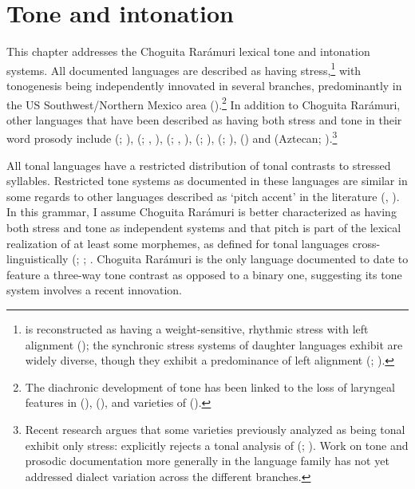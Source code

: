\chapter{Tone and intonation}
\label{chap: tone and intonation}

This chapter addresses the Choguita Rarámuri lexical tone and intonation systems. All documented  languages are described as having stress,\footnote{ is reconstructed as having a weight-sensitive, rhythmic stress with left alignment (\citealt{munro1977towards}); the synchronic stress systems of daughter languages exhibit are widely diverse, though they exhibit a predominance of left alignment (\citealt{caballero2011behind}; ).} with tonogenesis being independently innovated in several branches, predominantly in the US Southwest/Northern Mexico area (\citealt{caballero2020oxford}).\footnote{The diachronic development of tone has been linked to the loss of laryngeal features in  (\citealt{manaster1986genesis}),  (\citealt{shaul2000comparative}), and varieties of  (\citealt{guion2010word}).} In addition to Choguita Rarámuri, other  languages that have been described as having both stress and tone in their word prosody include  (; \citealt{demers1999prominence}),  (; \citealt{hagberg1989floating}, \citealt{hagberg1993autosegmental}),  (; \citealt{bascom1959tonomechanics}, \citealt{woo1970tone}),  (; \citealt{McMahon-1967}),  (; \citealt{grimes1959huichol}),  (\citealt{manaster1986genesis}) and  (Aztecan; \citealt{guion2010word}).\footnote{Recent research argues that some varieties previously analyzed as being tonal exhibit only stress: \citet{reyes2014fonologia} explicitly rejects a tonal analysis of  (; ). Work on tone and prosodic documentation more generally in the language family has not yet addressed dialect variation across the different branches.}

All tonal  languages have a restricted distribution of tonal contrasts to stressed syllables. Restricted tone systems as documented in these languages are similar in some regards to other languages described as `pitch accent' in the literature (\citealt{hyman2006word}, \citealt{van2011pitch}). In this grammar, I assume Choguita Rarámuri is better characterized as having both stress and tone as independent systems and that pitch is part of the lexical realization of at least some morphemes, as defined for tonal languages cross-linguistically (\citealt{yip2002tone}; \citealt{hyman2001tone}; \citealt[][229]{hyman2006word}. Choguita Rarámuri is the only  language documented to date to feature a three-way tone contrast as opposed to a binary one, suggesting its tone system involves a recent innovation.

